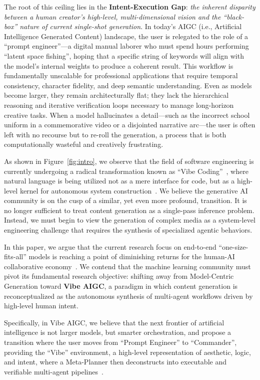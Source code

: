 \documentclass{article}
\begin{document}
The root of this ceiling lies in the \textbf{Intent-Execution Gap}: \textit{the inherent disparity between a human creator’s high-level, multi-dimensional vision and the ``black-box'' nature of current single-shot generation}. In today’s AIGC (i.e., Artificial Intelligence Generated Content) landscape, the user is relegated to the role of a ``prompt engineer''—a digital manual laborer who must spend hours performing ``latent space fishing'', hoping that a specific string of keywords will align with the model's internal weights to produce a coherent result. This workflow is fundamentally unscalable for professional applications that require temporal consistency, character fidelity, and deep semantic understanding. Even as models become larger, they remain architecturally flat; they lack the hierarchical reasoning and iterative verification loops necessary to manage long-horizon creative tasks. When a model hallucinates a detail—such as the incorrect school uniform in a commemorative video or a disjointed narrative arc—the user is often left with no recourse but to re-roll the generation, a process that is both computationally wasteful and creatively frustrating.

As shown in Figure~\ref{fig:intro},
we observe that the field of software engineering is currently undergoing a radical transformation known as ``Vibe Coding''~\citep{karpathy2025}, where natural language is being utilized not as a mere interface for code, but as a high-level kernel for autonomous system construction~\citep{mei2025survey}. We believe the generative AI community is on the cusp of a similar, yet even more profound, transition. It is no longer sufficient to treat content generation as a single-pass inference problem. Instead, we must begin to view the generation of complex media as a system-level engineering challenge that requires the synthesis of specialized agentic behaviors.

In this paper, we argue that the current research focus on end-to-end ``one-size-fits-all'' models is reaching a point of diminishing returns for the human-AI collaborative economy~\citep{bai2023qwentechnicalreport}. {We contend that the machine learning community must pivot its fundamental research objective: shifting away from Model-Centric Generation toward \textbf{Vibe AIGC}, a paradigm in which content generation is reconceptualized as the autonomous synthesis of multi-agent workflows driven by high-level human intent.}

Specifically,
in Vibe AIGC, we believe that the next frontier of artificial intelligence is not larger models, but smarter orchestration, and propose a transition where the user moves from ``Prompt Engineer'' to ``Commander'', providing the ``Vibe'' environment, a high-level representation of aesthetic, logic, and intent, where a Meta-Planner then deconstructs into executable and verifiable multi-agent pipelines~\citep{liu2023pre, horvat2025vibe}.
\end{document}
